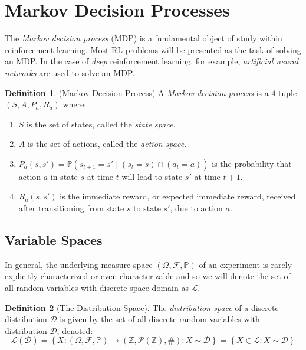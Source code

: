 \documentclass[a4paper,11pt,oneside]{book}
\theoremstyle{plain}
\theoremstyle{definition}
\newtheorem{defn}{Definition}[section]
\begin{document}
\section{Markov Decision Processes}
The \emph{Markov decision process} (MDP) is a fundamental object of study within reinforcement learning. Most RL problems will be presented as the task of solving an MDP. In the case of \emph{deep} reinforcement learning, for example, \emph{artificial neural networks} are used to solve an MDP.
\begin{defn}{(Markov Decision Process)}
A \emph{Markov decision process} is a $4$-tuple $(S, A, P_a, R_a)$ where:
\begin{enumerate}
\item $S$ is the set of states, called the \emph{state space}.
\item $A$ is the set of actions, called the \emph{action space}.
\item $P_a(s, s') = \mathbb{P}(s_{t+1} = s' \mid (s_t = s) \cap (a_t = a))$  is the probability that action $a$ in state $s$ at time $t$ will lead to state $s'$ at time $t+1$.
\item $R_a(s, s')$ is the immediate reward, or expected immediate reward, received after transitioning from state $s$ to state $s'$, due to action $a$.
\end{enumerate}
\end{defn}





































\pagebreak
\subsection{Variable Spaces}
In general, the underlying measure space $(\Omega, \mathcal{F},\mathbb{P})$ of an experiment is rarely explicitly characterized or even characterizable and so we will denote the set of all random variables with discrete space domain as $\mathcal{L}$.
\begin{defn}[The Distribution Space]
The \emph{distribution space} of a discrete distribution $\mathcal{D}$ is given by the set of all discrete random variables with distribution $\mathcal{D}$, denoted:
\[\mathcal{L}(\mathcal{D})=\left\{X:(\Omega, \mathcal{F},\mathbb{P})\rightarrow (\mathbb{Z},\mathcal{P}(\mathbb{Z}),\#) : X \sim \mathcal{D} \right\}=\left\{X \in \mathcal{L} : X \sim \mathcal{D} \right\}\]
\end{defn}
\end{document}
